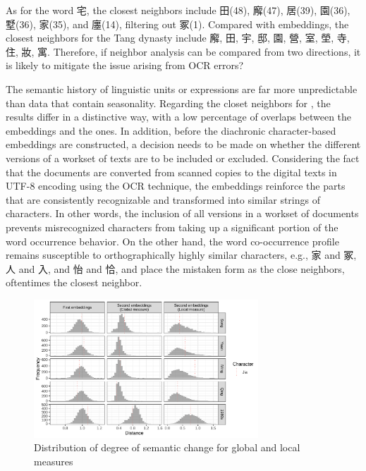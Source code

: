 As for the word 宅, the closest neighbors include 田(48), 廨(47), 居(39), 園(36), 墅(36), 家(35), and 廛(14), filtering out 冢(1). Compared with  embeddings, the closest neighbors for the Tang dynasty include 廨, 田, 宇, 邸, 園, 營, 室, 塋, 寺, 住, 妝, 寓. Therefore, if neighbor analysis can be compared from two directions, it is likely to mitigate the issue arising from OCR errors?

The semantic history of linguistic units or expressions are far more unpredictable than data that contain seasonality. Regarding the closet neighbors for \jia , the results differ in a distinctive way, with a low percentage of overlaps between the  embeddings and the  ones. In addition, before the diachronic character-based embeddings are constructed, a decision needs to be made on whether the different versions of a workset of texts are to be included or excluded. Considering the fact that the documents are converted from scanned copies to the digital texts in UTF-8 encoding using the OCR technique, the  embeddings reinforce the parts that are consistently recognizable and transformed into similar strings of characters. In other words, the inclusion of all versions in a workset of documents prevents misrecognized characters from taking up a significant portion of the word occurrence behavior. On the other hand, the word co-occurrence profile remains susceptible to orthographically highly similar characters, e.g., 家 and 冢, 人 and 入, and 怡 and 恰, and place the mistaken form as the close neighbors, oftentimes the closest neighbor.

\begin{figure}[H]
  \centering
  \includegraphics[width=0.75\textwidth,keepaspectratio]{figures_new/measures/dist_hist_w5.pdf}
  \caption{Distribution of degree of semantic change for global and local measures}
\end{figure}

